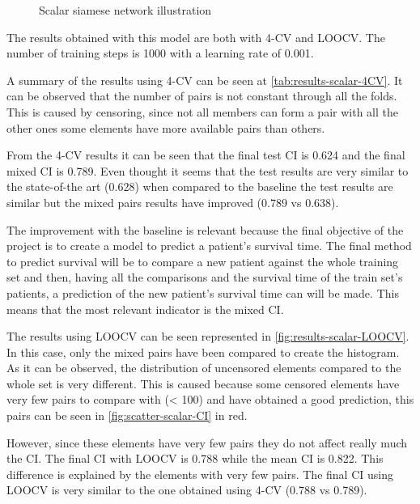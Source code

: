 \begin{figure}
  \centering
  
  \caption{Scalar siamese network illustration \label{fig:scalar-implement}}
\end{figure}


The results obtained with this model are both with 4-CV and \gls{LOOCV}. The number of training
steps is 1000 with a learning rate of 0.001.

A summary of the results using 4-CV can be seen at \autoref{tab:results-scalar-4CV}. It can be
observed that the number of pairs is not constant through all the folds. This is caused by
censoring, since not all members can form a pair with all the other ones some elements 
have more available pairs than others. 

From the 4-CV results it can be seen that the final test \gls{CI} is 0.624 and the final mixed 
\gls{CI} is 0.789. Even thought it seems that the test results are very similar to the
state-of-the art (0.628) when compared to the baseline the test results are similar but
the mixed pairs results have improved (0.789 vs 0.638).

The improvement with the baseline is relevant because the final objective of the project
is to create a model to predict a patient's survival time. The final method to predict
survival will be to compare a new patient against the whole training set and then, having
all the comparisons and the survival time of the train set's patients, a prediction of
the new patient's survival time can will be made. This means that the most relevant 
indicator is the mixed \gls{CI}.

The results using \gls{LOOCV} can be seen represented in \autoref{fig:results-scalar-LOOCV}. 
In this case, only the mixed pairs have been compared to create the histogram. As it can be 
observed, the distribution of uncensored elements compared to the whole set is very different. 
This is caused because some censored elements have very few pairs to compare with (< 100) and 
have obtained a good prediction, this pairs can be seen in \autoref{fig:scatter-scalar-CI} in red.

However, since these elements have very few pairs they do not affect really much the \gls{CI}.
The final \gls{CI} with \gls{LOOCV} is 0.788 while the mean \gls{CI} is 0.822. This difference
is explained by the elements with very few pairs. The final \gls{CI} using \gls{LOOCV} is 
very similar to the one obtained using 4-CV (0.788 vs 0.789).

